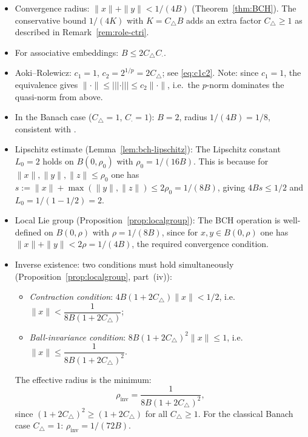 \documentclass[10pt]{amsart}
\theoremstyle{definition}
\theoremstyle{remark}
\numberwithin{equation}{section}
\newcommand{\Ctri}{C_{\triangle}}    %
\newcommand{\Cmult}{C_{\cdot}}       %
\newcommand{\Cbracket}{B}            %
\newcommand{\Ctotal}{K}              %
\newcommand{\pnorm}[1]{\left\vert\!\left\vert\!\left\vert #1 \right\vert\!\right\vert\!\right\vert} %
\begin{document}
\begin{itemize}
    \item Convergence radius: $\|x\|+\|y\| < 1/(4\Cbracket)$ (Theorem~\ref{thm:BCH}).
          The conservative bound $1/(4\Ctotal)$ with $\Ctotal = \Ctri\Cbracket$ adds an
          extra factor $\Ctri \ge 1$ as described in Remark~\ref{rem:role-ctri}.
    \item For associative embeddings: $\Cbracket \le 2\Ctri\Cmult$.
    \item Aoki--Rolewicz: $c_1 = 1$, $c_2 = 2^{1/p} = 2\Ctri$; see \eqref{eq:c1c2}.
          Note: since $c_1 = 1$, the equivalence gives $\|\cdot\| \le \pnorm{\cdot}
          \le c_2\|\cdot\|$, i.e.\ the $p$-norm dominates the quasi-norm from above.
    \item In the Banach case ($\Ctri=1$, $\Cmult=1$): $\Cbracket=2$, radius
          $1/(4\Cbracket) = 1/8$, consistent with \cite{Goldberg1956}.
    \item Lipschitz estimate (Lemma~\ref{lem:bch-lipschitz}): The Lipschitz constant
          $L_0 = 2$ holds on $B(0,\rho_0)$ with $\rho_0 = 1/(16\Cbracket)$.  This is
          because for $\|x\|,\|y\|,\|z\| \le \rho_0$ one has
          $s := \|x\|+\max(\|y\|,\|z\|) \le 2\rho_0 = 1/(8\Cbracket)$, giving
          $4\Cbracket s \le 1/2$ and $L_0 = 1/(1-1/2) = 2$.
    \item Local Lie group (Proposition~\ref{prop:localgroup}): The BCH operation is
          well-defined on $B(0,\rho)$ with $\rho = 1/(8\Cbracket)$, since for $x,y\in
          B(0,\rho)$ one has $\|x\|+\|y\| < 2\rho = 1/(4\Cbracket)$, the required
          convergence condition.
    \item Inverse existence: two conditions must hold simultaneously
          (Proposition~\ref{prop:localgroup}, part~(iv)):
          \begin{itemize}
            \item \emph{Contraction condition}: $4\Cbracket(1+2\Ctri)\|x\| < 1/2$,
                  i.e.\ $\|x\| < \dfrac{1}{8\Cbracket(1+2\Ctri)}$;
            \item \emph{Ball-invariance condition}: $8\Cbracket(1+2\Ctri)^2\|x\| \le 1$,
                  i.e.\ $\|x\| \le \dfrac{1}{8\Cbracket(1+2\Ctri)^2}$.
          \end{itemize}
          The effective radius is the minimum:
          \[
            \rho_{\mathrm{inv}} = \frac{1}{8\Cbracket(1+2\Ctri)^2},
          \]
          since $(1+2\Ctri)^2 \ge (1+2\Ctri)$ for all $\Ctri \ge 1$.
          For the classical Banach case $\Ctri=1$:
          $\rho_{\mathrm{inv}} = 1/(72\Cbracket)$.
\end{itemize}
\end{document}
